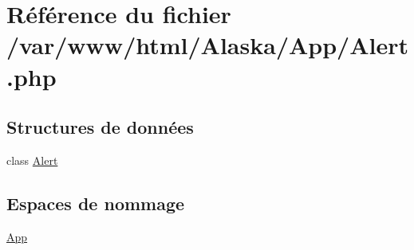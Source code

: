 \hypertarget{_alert_8php}{}\section{Référence du fichier /var/www/html/\+Alaska/\+App/\+Alert.php}
\label{_alert_8php}
\subsection*{Structures de données}
\begin{DoxyCompactItemize}
\item 
class \hyperlink{class_app_1_1_alert}{Alert}
\end{DoxyCompactItemize}
\subsection*{Espaces de nommage}
\begin{DoxyCompactItemize}
\item 
 \hyperlink{namespace_app}{App}
\end{DoxyCompactItemize}
